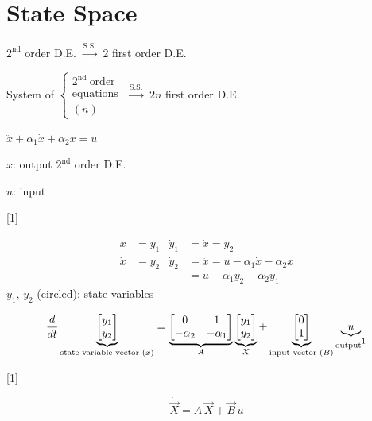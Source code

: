 \documentclass[11pt,a4paper]{article}
\begin{document}

\section{State Space}

$2^{\mathrm{nd}}$ order D.E. $\xrightarrow{\text{S.S.}}$ 2 first order D.E.

System of $\left\{\begin{array}{l}2^{\mathrm{nd}}\ \text{order}\\ \text{equations}\\ (n)\end{array}\right.$ $\xrightarrow{\text{S.S.}}$ $2n$ first order D.E.

\begin{ornek}
$\ddot{x}+\alpha_1\dot{x}+\alpha_2 x=u$

$x$: output $2^{\mathrm{nd}}$ order D.E.

$u$: input

[1]

\begin{align*}
x &= y_1 & \dot{y}_1 &= \dot{x} = y_2\\
\dot{x} &= y_2 & \dot{y}_2 &= \ddot{x} = u-\alpha_1\dot{x}-\alpha_2 x\\
 & & &= u-\alpha_1 y_2-\alpha_2 y_1
\end{align*}
$y_1,\,y_2$ (circled): state variables

\[
\frac{d}{dt}\underbrace{\begin{bmatrix}y_1\\y_2\end{bmatrix}}_{\text{state variable vector }(x)}
=\underbrace{\begin{bmatrix}0&1\\-\alpha_2&-\alpha_1\end{bmatrix}}_{A}
\underbrace{\begin{bmatrix}y_1\\y_2\end{bmatrix}}_{X}
+\underbrace{\begin{bmatrix}0\\1\end{bmatrix}}_{\text{input vector }(B)}
\underbrace{u}_{\text{output}\footnotemark}
\]

[1]

\[
\dot{\vec{X}} = A\,\vec{X}+\vec{B}\,u
\]
\end{ornek}
\end{document}

